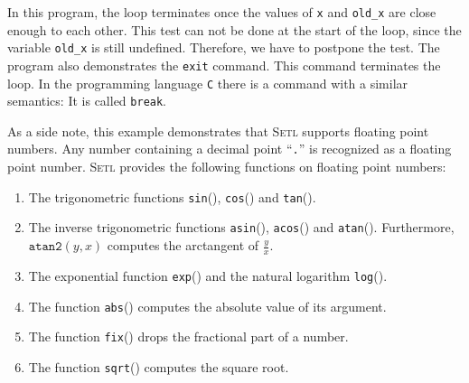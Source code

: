 In this program, the loop terminates once the values of  \texttt{x} and \texttt{old\_x} are
close enough to each other.  This test can not be done at the start of the loop, since the
variable  \texttt{old\_x} is still undefined.  Therefore, we have to postpone the test.
The program also demonstrates the  \texttt{exit} command.  This command terminates the
loop.  In the programming language \texttt{C}  there is a command with a similar
semantics: It is called  \texttt{break}.

As a side note, this example demonstrates that  \textsc{Setl} supports floating point numbers.
Any number containing a decimal point ``\texttt{.}'' is recognized as a floating point
number.
 \textsc{Setl} provides the following functions on floating point numbers:
\begin{enumerate}
\item The trigonometric functions \texttt{sin}(), \texttt{cos}() and \texttt{tan}().
\item The inverse trigonometric functions
      \texttt{asin}(), \texttt{acos}() and \texttt{atan}().  Furthermore,
      $\texttt{atan2}(y,x)$ computes the arctangent of $\frac{\displaystyle y}{\displaystyle x}$.  
\item The exponential function  \texttt{exp}() and the natural logarithm
      \texttt{log}().
\item The function \texttt{abs}() computes the absolute value of its
      argument.
\item The function \texttt{fix}() drops the fractional part of a number.
\item The function \texttt{sqrt}() computes the square root.
\end{enumerate}

